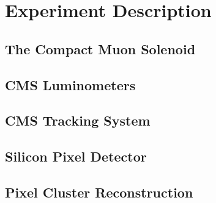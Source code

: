 \chapter{Experiment Description}
 
 
\section{The Compact Muon Solenoid}


\section{CMS Luminometers}
\label{Luminometers}


\section{CMS Tracking System}


\section{Silicon Pixel Detector}


\section{Pixel Cluster Reconstruction}


